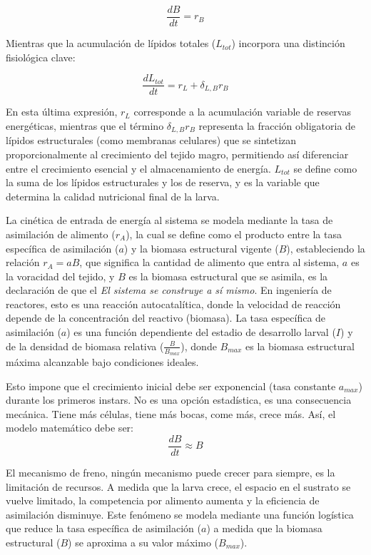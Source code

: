 \begin{equation}
\frac{dB}{dt} = r_B
\end{equation}

Mientras que la acumulación de lípidos totales ($L_{tot}$) incorpora una distinción fisiológica clave:

\begin{equation}
\frac{dL_{tot}}{dt} = r_L + \delta_{L,B} r_B
\end{equation}

En esta última expresión, $r_L$ corresponde a la acumulación variable de reservas energéticas, 
mientras que el término $\delta_{L,B} r_B$ representa la fracción obligatoria de lípidos estructurales 
(como membranas celulares) que se sintetizan proporcionalmente al crecimiento del tejido magro, 
permitiendo así diferenciar entre el crecimiento esencial y el almacenamiento de energía. $L_{tot}$
se define como la suma de los lípidos estructurales y los de reserva, y es la variable que determina la calidad nutricional final de la larva.

La cinética de entrada de energía al sistema se modela mediante la tasa de asimilación 
de alimento ($r_A$), la cual se define como el producto entre la tasa específica de asimilación ($a$) 
y la biomasa estructural vigente ($B$), estableciendo la relación $r_A = a B$, que significa la cantidad de alimento que entra al sistema, $a$ es la voracidad del tejido, y $B$ es la biomasa estructural que se asimila, es la declaración de que el \textit{El sistema se construye a sí mismo}. En ingeniería de reactores, esto es una reacción autocatalítica, donde la velocidad de reacción depende de la concentración del reactivo (biomasa).  La tasa específica de asimilación ($a$) es una función dependiente del estadio de desarrollo larval ($I$) y de la densidad de biomasa relativa ($\frac{B}{B_{max}}$), donde $B_{max}$ es la biomasa estructural máxima alcanzable bajo condiciones ideales.

Esto impone que el crecimiento inicial debe ser exponencial (tasa constante $a_{max}$) durante los primeros instars. No es una opción estadística, es una consecuencia mecánica. Tiene más células, tiene más bocas, come más, crece más. Así, el modelo matemático debe ser:
\begin{equation}
\frac{dB}{dt}  \approx  B
\end{equation}

El mecanismo de freno, ningún mecanismo puede crecer para siempre, es la limitación de recursos. A medida que la larva crece, el espacio en el sustrato se vuelve limitado, la competencia por alimento aumenta y la eficiencia de asimilación disminuye. Este fenómeno se modela mediante una función logística que reduce la tasa específica de asimilación ($a$) a medida que la biomasa estructural ($B$) se aproxima a su valor máximo ($B_{max}$).

